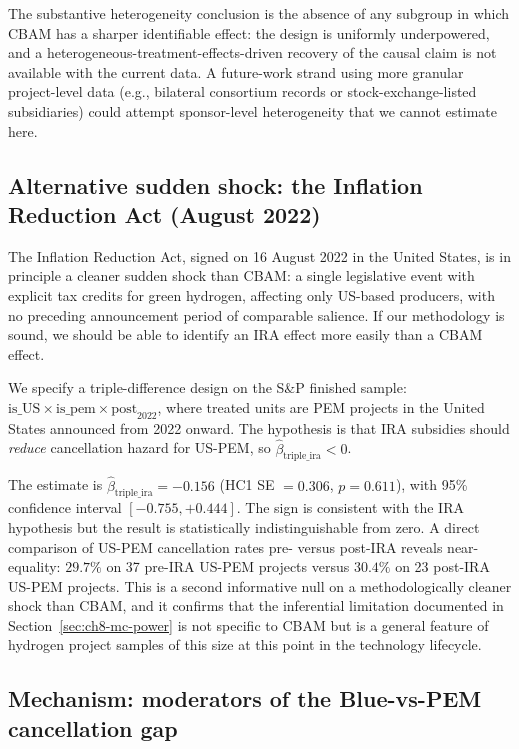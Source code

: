 \documentclass[11pt,a4paper]{article}
\begin{document}
The substantive heterogeneity conclusion is the absence of any subgroup in which CBAM has a sharper identifiable effect: the design is uniformly underpowered, and a heterogeneous-treatment-effects-driven recovery of the causal claim is not available with the current data. A future-work strand using more granular project-level data (e.g., bilateral consortium records or stock-exchange-listed subsidiaries) could attempt sponsor-level heterogeneity that we cannot estimate here.

\subsection{Alternative sudden shock: the Inflation Reduction Act (August 2022)}

The Inflation Reduction Act, signed on 16 August 2022 in the United States, is in principle a cleaner sudden shock than CBAM: a single legislative event with explicit tax credits for green hydrogen, affecting only US-based producers, with no preceding announcement period of comparable salience. If our methodology is sound, we should be able to identify an IRA effect more easily than a CBAM effect.

We specify a triple-difference design on the S\&P finished sample: $\mathrm{is\_US} \times \mathrm{is\_pem} \times \mathrm{post}_{2022}$, where treated units are PEM projects in the United States announced from 2022 onward. The hypothesis is that IRA subsidies should \emph{reduce} cancellation hazard for US-PEM, so $\hat\beta_{\mathrm{triple\_ira}} < 0$.

The estimate is $\hat\beta_{\mathrm{triple\_ira}} = -0.156$ (HC1 SE $= 0.306$, $p = 0.611$), with 95\% confidence interval $[-0.755, +0.444]$. The sign is consistent with the IRA hypothesis but the result is statistically indistinguishable from zero. A direct comparison of US-PEM cancellation rates pre- versus post-IRA reveals near-equality: $29.7\%$ on 37 pre-IRA US-PEM projects versus $30.4\%$ on 23 post-IRA US-PEM projects. This is a second informative null on a methodologically cleaner shock than CBAM, and it confirms that the inferential limitation documented in Section~\ref{sec:ch8-mc-power} is not specific to CBAM but is a general feature of hydrogen project samples of this size at this point in the technology lifecycle.

\subsection{Mechanism: moderators of the Blue-vs-PEM cancellation gap}
\end{document}
